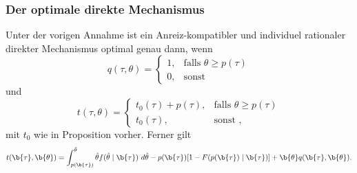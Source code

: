 \begin{frame}
  \frametitle{Der optimale direkte Mechanismus}
  \justifying
  \begin{thmS}
    Unter der vorigen Annahme ist ein Anreiz-kompatibler und individuel rationaler direkter Mechanismus optimal genau dann, wenn
    \begin{equation*}
      q(\tau, \theta) = \left\{\begin{array}{lr}
        1, & \text{falls } \theta \ge p(\tau) \\
        0, & \text{sonst }
        \end{array}
    \end{equation*}
    und
    \begin{equation*}
      t(\tau, \theta) = \left\{\begin{array}{lr}
        t_{0}(\tau) + p(\tau), & \text{falls } \theta \ge p(\tau) \\
        t_{0}(\tau), & \text{sonst },
        \end{array}
    \end{equation*}
    mit $t_{0}$ wie in Proposition vorher. Ferner gilt
    \begin{equation*}
      t(\b{\tau}, \b{\theta}) = \int_{p(\b{\tau})}^{\bar{\theta}}\hat{\theta} f(\hat{\theta} \mid \b{\tau}) \ d \hat{\theta} - p(\b{\tau}) [1 - F(p(\b{\tau}) \mid \b{\tau})] + \b{\theta} q(\b{\tau}, \b{\theta}).
    \end{equation*}
  \end{thmS}
\end{frame}

\bgroup
{}
\begin{frame}[plain]{}
\end{frame}
\egroup
